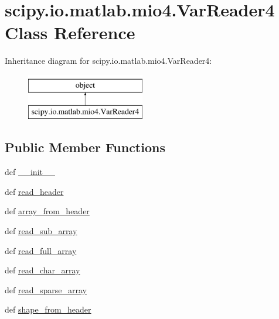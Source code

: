 \hypertarget{classscipy_1_1io_1_1matlab_1_1mio4_1_1VarReader4}{}\section{scipy.\+io.\+matlab.\+mio4.\+Var\+Reader4 Class Reference}
\label{classscipy_1_1io_1_1matlab_1_1mio4_1_1VarReader4}
Inheritance diagram for scipy.\+io.\+matlab.\+mio4.\+Var\+Reader4\+:\begin{figure}[H]
\begin{center}
\leavevmode
\includegraphics[height=2.000000cm]{classscipy_1_1io_1_1matlab_1_1mio4_1_1VarReader4}
\end{center}
\end{figure}
\subsection*{Public Member Functions}
\begin{DoxyCompactItemize}
\item 
def \hyperlink{classscipy_1_1io_1_1matlab_1_1mio4_1_1VarReader4_a694a151ab652e638fbb001008bf6b51d}{\+\_\+\+\_\+init\+\_\+\+\_\+}
\item 
def \hyperlink{classscipy_1_1io_1_1matlab_1_1mio4_1_1VarReader4_a4183d6dbe1556a62ea41e23e7a7c4fc0}{read\+\_\+header}
\item 
def \hyperlink{classscipy_1_1io_1_1matlab_1_1mio4_1_1VarReader4_af42d7fbd860d2e77c8be5c93e727056f}{array\+\_\+from\+\_\+header}
\item 
def \hyperlink{classscipy_1_1io_1_1matlab_1_1mio4_1_1VarReader4_aa7e683ec53ea0da48f26f0dfdbde5e3a}{read\+\_\+sub\+\_\+array}
\item 
def \hyperlink{classscipy_1_1io_1_1matlab_1_1mio4_1_1VarReader4_afab9f3663c5b6484baec00d274fa2ec2}{read\+\_\+full\+\_\+array}
\item 
def \hyperlink{classscipy_1_1io_1_1matlab_1_1mio4_1_1VarReader4_a166c3451cc9405314d48589f7602e77c}{read\+\_\+char\+\_\+array}
\item 
def \hyperlink{classscipy_1_1io_1_1matlab_1_1mio4_1_1VarReader4_ac6a6e6d00bfe1f139cc17aa47ac29fb0}{read\+\_\+sparse\+\_\+array}
\item 
def \hyperlink{classscipy_1_1io_1_1matlab_1_1mio4_1_1VarReader4_a71b56417bd987e5f21bcb5c2dd4d9023}{shape\+\_\+from\+\_\+header}
\end{DoxyCompactItemize}
